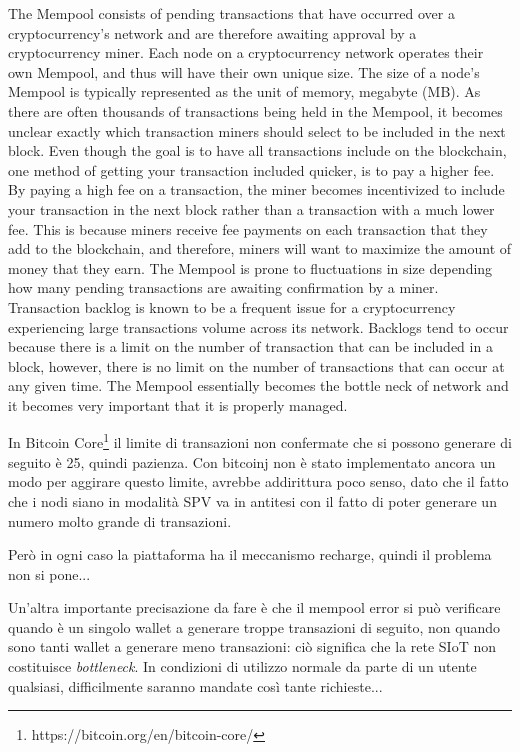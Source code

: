 The Mempool consists of pending transactions that have occurred over a cryptocurrency’s network and are therefore awaiting approval by a cryptocurrency miner. Each node on a cryptocurrency network operates their own Mempool, and thus will have their own unique size. The size of a node’s Mempool is typically represented as the unit of memory, megabyte (MB).
As there are often thousands of transactions being held in the Mempool, it becomes unclear exactly which transaction miners should select to be included in the next block. Even though the goal is to have all transactions include on the blockchain, one method of getting your transaction included quicker, is to pay a higher fee. By paying a high fee on a transaction, the miner becomes incentivized to include your transaction in the next block rather than a transaction with a much lower fee. This is because miners receive fee payments on each transaction that they add to the blockchain, and therefore, miners will want to maximize the amount of money that they earn. 
The Mempool is prone to fluctuations in size depending how many pending transactions are awaiting confirmation by a miner. Transaction backlog is known to be a frequent issue for a cryptocurrency experiencing large transactions volume across its network. Backlogs tend to occur because there is a limit on the number of transaction that can be included in a block, however, there is no limit on the number of transactions that can occur at any given time. The Mempool essentially becomes the bottle neck of network and it becomes very important that it is properly managed.

In Bitcoin Core\footnote{https://bitcoin.org/en/bitcoin-core/} il limite di transazioni non confermate che si possono generare di seguito è 25, quindi pazienza. Con bitcoinj non è stato implementato ancora un modo per aggirare questo limite, avrebbe addirittura poco senso, dato che il fatto che i nodi siano in modalità SPV va in antitesi con il fatto di poter generare un numero molto grande di transazioni.

Però in ogni caso la piattaforma ha il meccanismo recharge, quindi il problema non si pone...

Un'altra importante precisazione da fare è che il mempool error si può verificare quando è un singolo wallet a generare troppe transazioni di seguito, non quando sono tanti wallet a generare meno transazioni: ciò significa che la rete SIoT non costituisce \textit{bottleneck}. In condizioni di utilizzo normale da parte di un utente qualsiasi, difficilmente saranno mandate così tante richieste...

